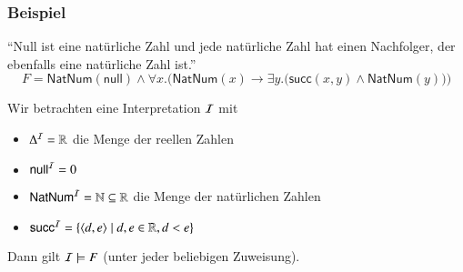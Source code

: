 \documentclass[aspectratio=1610,onlymath]{beamer}
\begin{document}
\begin{frame}\frametitle{Beispiel}

\alert{"`Null ist eine natürliche Zahl und jede natürliche Zahl hat einen Nachfolger, der
ebenfalls eine natürliche Zahl ist."'}
\[ F=\textsf{NatNum}(\textsf{null})\wedge \forall x.\Big(\textsf{NatNum}(x)\to\exists y.\big(\textsf{succ}(x,y)\wedge \textsf{NatNum}(y)\big)\Big)\]

Wir betrachten eine Interpretation $\mathcal{I}$ mit
\begin{itemize}
\item $\Delta^{\mathcal{I}}=\mathbb{R}$ die Menge der reellen Zahlen
\item $\textsf{null}^{\mathcal{I}}=0$
\item $\textsf{NatNum}^{\mathcal{I}}=\mathbb{N}\subseteq\mathbb{R}$ die Menge der natürlichen Zahlen
\item $\textsf{succ}^{\mathcal{I}}=\{\langle{d,e}\rangle\mid d,e\in\mathbb{R},d<e\}$
\end{itemize}\bigskip

Dann gilt $\mathcal{I}\models F$ (unter jeder beliebigen Zuweisung).


\end{frame}
\end{document}
